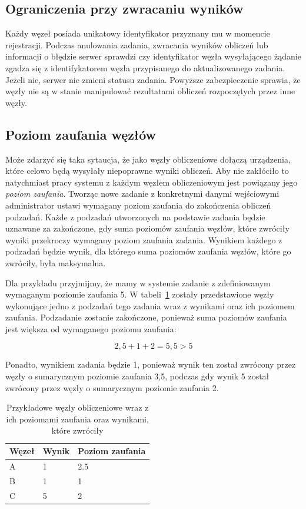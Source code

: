 \documentclass[a4paper,11pt,twoside]{report}
\theoremstyle{definition}
\begin{document}
\subsection{Ograniczenia przy zwracaniu wyników}

Każdy węzeł posiada unikatowy identyfikator przyznany mu w momencie rejestracji. Podczas anulowania zadania, zwracania wyników obliczeń lub informacji o błędzie serwer sprawdzi czy identyfikator węzła wysyłającego żądanie zgadza się z identifykatorem węzła przypisanego do aktualizowanego zadania. Jeżeli nie, serwer nie zmieni statusu zadania. Powyższe zabezpieczenie sprawia, że węzły nie są w stanie manipulować rezultatami obliczeń rozpoczętych przez inne węzły.

\subsection{Poziom zaufania węzłów}
\label{poziom-zaufania-wezlow}

Może zdarzyć się taka sytaucja, że jako węzły obliczeniowe dołączą urządzenia, które celowo będą wysyłały niepoprawne wyniki obliczeń. 
Aby nie zakłóciło to natychmiast pracy systemu z każdym węzłem obliczeniowym jest powiązany jego \textit{poziom zaufania}. Tworząc nowe zadanie z konkretnymi danymi wejściowymi administrator ustawi wymagany poziom zaufania do zakończenia obliczeń podzadań.
Każde z podzadań utworzonych na podstawie zadania będzie uznawane za zakończone, gdy suma poziomów zaufania węzłów, które zwróciły wyniki przekroczy wymagany poziom zaufania zadania.
Wynikiem każdego z podzadań będzie wynik, dla którego suma poziomów zaufania węzłów, które go zwróciły, była maksymalna.

Dla przykładu przyjmijmy, że mamy w systemie zadanie z zdefiniowanym wymaganym poziomie zaufania 5. W tabeli~\ref{trust-level-example} zostały przedstawione węzły wykonujące jedno z podzadań tego zadania wraz z wynikami oraz ich poziomem zaufania.
Podzadanie zostanie zakończone, ponieważ suma poziomów zaufania jest większa od wymaganego poziomu zaufania:

\[2,5 + 1 + 2 = 5,5 > 5\]

Ponadto, wynikiem zadania będzie 1, ponieważ wynik ten został zwrócony przez węzły o sumarycznym poziomie zaufania 3,5, podczas gdy wynik 5 został zwrócony przez węzły o sumarycznym poziomie zaufania 2.

\begin{table}
    \centering
    \caption{Przykładowe węzły obliczeniowe wraz z ich poziomami zaufania oraz wynikami, które zwróciły}
    \label{trust-level-example}
    \begin{tabular}{|l|l|l|}
        \hline
        Węzeł & Wynik & Poziom zaufania \\ \hline
        A     & 1     & 2.5             \\ \hline
        B     & 1     & 1               \\ \hline
        C     & 5     & 2               \\ \hline
    \end{tabular}
\end{table}
\end{document}
